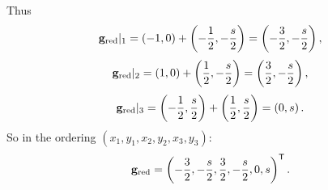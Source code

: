 \documentclass[12pt,letterpaper]{amsart}
\theoremstyle{definition}
\theoremstyle{remark}
\begin{document}
Thus
\[
{\bf g}_{\rm red}|_1=\left(-1,0\right)+\left(-\frac12,-\frac{s}{2}\right)=\left(-\frac32,-\frac{s}{2}\right),
\]
\[
{\bf g}_{\rm red}|_2=\left(1,0\right)+\left(\frac12,-\frac{s}{2}\right)=\left(\frac32,-\frac{s}{2}\right),
\]
\[
{\bf g}_{\rm red}|_3=\left(-\frac12,\frac{s}{2}\right)+\left(\frac12,\frac{s}{2}\right)=\left(0,s\right).
\]
So in the ordering $(x_1,y_1,x_2,y_2,x_3,y_3)$:
\[
{\bf g}_{\rm red}=\left(-\frac32,-\frac{s}{2},\frac32,-\frac{s}{2},0,s\right)^\mathsf T.
\]

\end{document}
